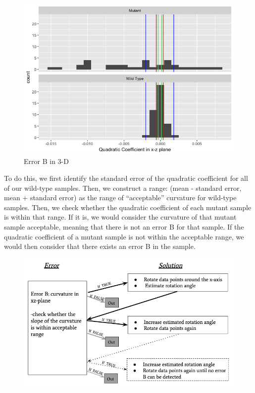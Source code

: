 \documentclass[10pt,letterpaper]{article}
\begin{document}
\begin{figure}[H]
\includegraphics[width=0.9\linewidth]{visualization_paper/range_for_is_errorB} \caption{Error B in 3-D}\label{fig:Figure7}
\end{figure}

To do this, we first identify the standard error of the quadratic
coefficient for all of our wild-type samples. Then, we construct a
range: (mean - standard error, mean + standard error) as the range of
``acceptable'' curvature for wild-type samples. Then, we check whether
the quadratic coefficient of each mutant sample is within that range. If
it is, we would consider the curvature of that mutant sample acceptable,
meaning that there is not an error B for that sample. If the quadratic
coefficient of a mutant sample is not within the acceptable range, we
would then consider that there exists an error B in the sample.

\begin{figure}[H]
\includegraphics[width=0.9\linewidth]{visualization_paper/diagram_2errors} \end{figure}
\end{document}
